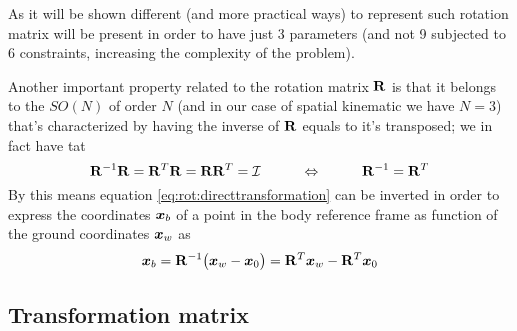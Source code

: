 	As it will be shown different (and more practical ways) to represent such rotation matrix will be present in order to have just 3 parameters (and not 9 subjected to 6 constraints, increasing the complexity of the problem).
	
	Another important property related to the rotation matrix $\mathbf{R}$ is that it belongs to the  $SO(N)$ of order $N$ (and in our case of spatial kinematic we have $N=3$) that's characterized by having the inverse of $\mathbf{R}$ equals to it's transposed; we in fact have tat
	\begin{equation}
		\mathbf{R}^{-1} \mathbf{R}= \mathbf{R}^T \mathbf{R}= \mathbf{R} \mathbf{R}^T = \mathcal I \hspace{1cm} \Leftrightarrow \hspace{1cm} \mathbf{R}^{-1} = \mathbf{R}^T
	\end{equation}
	By this means equation \ref{eq:rot:directtransformation} can be inverted in order to express the coordinates $\boldsymbol{x}_b$ of a point in the body reference frame as function of the ground coordinates $\boldsymbol{x}_w$ as 
	\begin{equation} \label{eq:rot:inversetransformation}
		\boldsymbol{x}_b = \mathbf{R}^{-1} \big(\boldsymbol{x}_w - \boldsymbol{x}_0\big) = \mathbf{R}^T \boldsymbol{x}_w - \mathbf{R}^T \boldsymbol{x}_0
	\end{equation}

	\subsection{Transformation matrix}	
		
